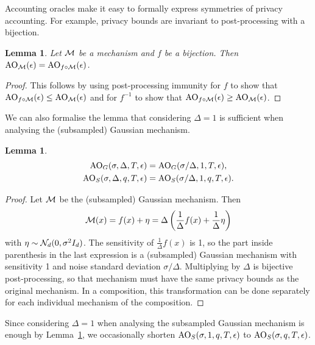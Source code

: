 \documentclass{article}
\theoremstyle{plain}
\newtheorem{lemma}[theorem]{Lemma}
\theoremstyle{definition}
\theoremstyle{remark}
\begin{document}
Accounting oracles make it easy to formally express symmetries of privacy accounting. 
For example, privacy bounds are invariant to post-processing with a bijection.
\begin{lemma}\label{lemma:bijective-post-processing-immunity}
    Let $\mathcal{M}$ be a mechanism and $f$ be a bijection. Then
        $\mathrm{AO}_{\mathcal{M}}(\epsilon) = \mathrm{AO}_{f\circ \mathcal{M}}(\epsilon)$.
\end{lemma}
\begin{proof}
    This follows by using post-processing immunity for $f$ to show that 
    $\mathrm{AO}_{f \circ \mathcal{M}}(\epsilon) \leq \mathrm{AO}_{\mathcal{M}}(\epsilon)$ and for 
    $f^{-1}$ to show that $\mathrm{AO}_{f \circ \mathcal{M}}(\epsilon) \geq \mathrm{AO}_{\mathcal{M}}(\epsilon)$.
\end{proof}
We can also formalise the lemma that considering 
$\Delta = 1$ is sufficient when analysing the (subsampled) Gaussian mechanism.
\begin{lemma}\label{lemma:sensitivity-to-noise-exchange}
    \begin{align}
        \mathrm{AO}_G(\sigma, \Delta, T, \epsilon) &= \mathrm{AO}_G(\sigma/\Delta, 1, T, \epsilon), \\
        \mathrm{AO}_S(\sigma, \Delta, q, T, \epsilon) &= \mathrm{AO}_S(\sigma/\Delta, 1, q, T, \epsilon).
    \end{align}
\end{lemma}
\begin{proof}
    Let $\mathcal{M}$ be the (subsampled) Gaussian mechanism. Then 
    \begin{equation}
        \mathcal{M}(x) = f(x) + \eta = \Delta\left(\frac{1}{\Delta} f(x) + \frac{1}{\Delta}\eta \right)
    \end{equation}
    with $\eta \sim \mathcal{N}_d(0, \sigma^2 I_d)$.
    The sensitivity of $\frac{1}{\Delta}f(x)$ is 1, so the part inside parenthesis
    in the last expression is a (subsampled) Gaussian mechanism with sensitivity 1
    and noise standard deviation $\sigma/\Delta$. Multiplying by $\Delta$ is bijective
    post-processing, so that mechanism must have the same privacy bounds 
    as the original mechanism. In a composition, this transformation can be done separately 
    for each individual mechanism of the composition.
\end{proof}
Since considering $\Delta = 1$ when analysing the subsampled Gaussian mechanism is enough 
by Lemma~\ref{lemma:sensitivity-to-noise-exchange}, we occasionally shorten 
$\mathrm{AO}_S(\sigma, 1, q, T, \epsilon)$ to $\mathrm{AO}_S(\sigma, q, T, \epsilon)$.
\end{document}
